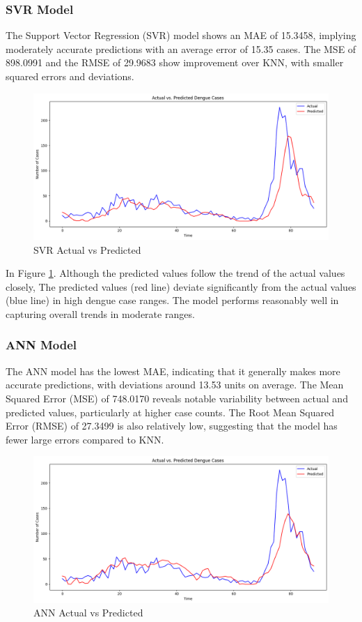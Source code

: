 \documentclass{article}
\begin{document}
\subsubsection{SVR Model}
The Support Vector Regression (SVR) model shows an MAE of 15.3458, implying moderately accurate predictions with an average error of 15.35 cases. The MSE of 898.0991 and the RMSE of 29.9683 show improvement over KNN, with smaller squared errors and deviations.
\begin{figure}[h!]
    \centering
    \includegraphics[width=1\linewidth]{image/svr plot.png}
    \caption{SVR Actual vs Predicted}
    \label{fig:svr}
\end{figure}

In Figure \ref{fig:svr}. Although the predicted values follow the trend of the actual values closely, The predicted values (red line) deviate significantly from the actual values (blue line) in high dengue case ranges. The model performs reasonably well in capturing overall trends in moderate ranges.

\subsubsection{ANN Model}
The ANN model has the lowest MAE, indicating that it generally makes more accurate predictions, with deviations around 13.53 units on average. The Mean Squared Error (MSE) of 748.0170 reveals notable variability between actual and predicted values, particularly at higher case counts. The Root Mean Squared Error (RMSE) of 27.3499 is also relatively low, suggesting that the model has fewer large errors compared to KNN.
\begin{figure}[h!]
    \centering
    \includegraphics[width=1\linewidth]{image/Ann plot.png}
    \caption{ANN Actual vs Predicted}
    \label{fig:ann}
\end{figure}
\end{document}
